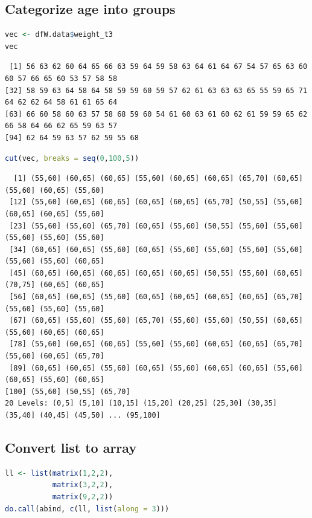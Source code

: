 \documentclass{article}
\begin{document}
\subsection{Categorize age into groups}
\label{sec:orgfb810c9}
\begin{lstlisting}[language=r,numbers=none]
vec <- dfW.data$weight_t3
vec
\end{lstlisting}

\label{}
\begin{verbatim}
 [1] 56 63 62 60 64 65 66 63 59 64 59 58 63 64 61 64 67 54 57 65 63 60 60 57 66 65 60 53 57 58 58
[32] 58 59 63 64 58 64 58 59 59 60 59 57 62 61 63 63 63 65 55 59 65 71 64 62 62 64 58 61 61 65 64
[63] 66 60 58 60 63 57 58 68 59 60 54 61 60 63 61 60 62 61 59 59 65 62 66 58 64 66 62 65 59 63 57
[94] 62 64 59 63 57 62 59 55 68
\end{verbatim}


\begin{lstlisting}[language=r,numbers=none]
cut(vec, breaks = seq(0,100,5))
\end{lstlisting}

\label{}
\begin{verbatim}
  [1] (55,60] (60,65] (60,65] (55,60] (60,65] (60,65] (65,70] (60,65] (55,60] (60,65] (55,60]
 [12] (55,60] (60,65] (60,65] (60,65] (60,65] (65,70] (50,55] (55,60] (60,65] (60,65] (55,60]
 [23] (55,60] (55,60] (65,70] (60,65] (55,60] (50,55] (55,60] (55,60] (55,60] (55,60] (55,60]
 [34] (60,65] (60,65] (55,60] (60,65] (55,60] (55,60] (55,60] (55,60] (55,60] (55,60] (60,65]
 [45] (60,65] (60,65] (60,65] (60,65] (60,65] (50,55] (55,60] (60,65] (70,75] (60,65] (60,65]
 [56] (60,65] (60,65] (55,60] (60,65] (60,65] (60,65] (60,65] (65,70] (55,60] (55,60] (55,60]
 [67] (60,65] (55,60] (55,60] (65,70] (55,60] (55,60] (50,55] (60,65] (55,60] (60,65] (60,65]
 [78] (55,60] (60,65] (60,65] (55,60] (55,60] (60,65] (60,65] (65,70] (55,60] (60,65] (65,70]
 [89] (60,65] (60,65] (55,60] (60,65] (55,60] (60,65] (60,65] (55,60] (60,65] (55,60] (60,65]
[100] (55,60] (50,55] (65,70]
20 Levels: (0,5] (5,10] (10,15] (15,20] (20,25] (25,30] (30,35] (35,40] (40,45] (45,50] ... (95,100]
\end{verbatim}
\subsection{Convert list to array}
\label{sec:orgff17c9a}

\begin{lstlisting}[language=r,numbers=none]
ll <- list(matrix(1,2,2),
           matrix(3,2,2),
           matrix(9,2,2))
do.call(abind, c(ll, list(along = 3)))
\end{lstlisting}
\end{document}
